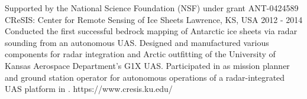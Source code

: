 \begin{cventries}
\begin{multicols}{2}
  \cvprojentry
    {Supported by the National Science Foundation (NSF) under grant ANT-0424589} %
    {CReSIS: Center for Remote Sensing of Ice Sheets} %
    {Lawrence, KS, USA} %
    {2012 - 2014} %
    {Conducted the first successful bedrock mapping of Antarctic ice sheets via radar sounding from an autonomous UAS.} %
    {Designed and manufactured various components for radar integration and Arctic outfitting of the University of Kansas Aerospace Department's G1X UAS. Participated in  as mission planner and ground station operator for autonomous operations of a radar-integrated UAS platform in .} %
    {https://www.cresis.ku.edu/}

\end{multicols}
\end{cventries}
